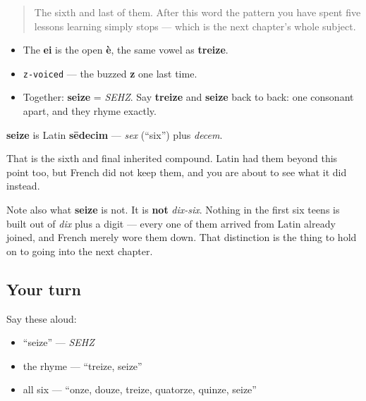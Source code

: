 \label{lesson:FR-C12-seize}



\begin{quote}
The sixth and last of them. After this word the pattern you have spent five lessons learning simply stops — which is the next chapter's whole subject.
\end{quote}

\begin{sounds}
\begin{itemize}
\raggedright
  \item The \textbf{ei} is the open \textbf{è}, the same vowel as \textbf{treize}.
  \item \texttt{z-voiced} — the buzzed \textbf{z} one last time.
  \item Together: \textbf{seize} = \emph{SEHZ}. Say \textbf{treize} and \textbf{seize} back to back: one consonant apart, and they rhyme exactly.
\end{itemize}
\end{sounds}

\begin{cousinweb}
\textbf{seize} is Latin \textbf{sēdecim} — \emph{sex} (\textquotedblleft{}six\textquotedblright{}) plus \emph{decem}.

That is the sixth and final inherited compound. Latin had them beyond this point too, but French did not keep them, and you are about to see what it did instead.

Note also what \textbf{seize} is not. It is \textbf{not} \emph{dix-six}. Nothing in the first six teens is built out of \emph{dix} plus a digit — every one of them arrived from Latin already joined, and French merely wore them down. That distinction is the thing to hold on to going into the next chapter.
\end{cousinweb}

\subsection*{Your turn}
Say these aloud:

\begin{itemize}
\raggedright
  \item \textquotedblleft{}seize\textquotedblright{} — \emph{SEHZ}
  \item the rhyme — \textquotedblleft{}treize, seize\textquotedblright{}
  \item all six — \textquotedblleft{}onze, douze, treize, quatorze, quinze, seize\textquotedblright{}
\end{itemize}

